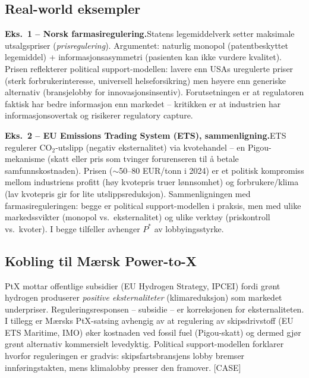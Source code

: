 \subsection*{Real-world eksempler}

\textbf{Eks.~1 -- Norsk farmasiregulering.}\quad [EKS]
Statens legemiddelverk setter maksimale utsalgspriser (\emph{prisregulering}). Argumentet: naturlig monopol (patentbeskyttet legemiddel) + informasjonsasymmetri (pasienten kan ikke vurdere kvalitet). Prisen reflekterer political support-modellen: lavere enn USAs uregulerte priser (sterk forbrukerinteresse, universell helseforsikring) men høyere enn generiske alternativ (bransjelobby for innovasjonsinsentiv). Forutsetningen er at regulatoren faktisk har bedre informasjon enn markedet -- kritikken er at industrien har informasjonsovertak og risikerer regulatory capture.

\textbf{Eks.~2 -- EU Emissions Trading System (ETS), sammenligning.}\quad [EKS]
ETS regulerer CO$_2$-utslipp (negativ eksternalitet) via kvotehandel -- en Pigou-mekanisme (skatt eller pris som tvinger forurenseren til å betale samfunnskostnaden). Prisen ($\sim$50--80 EUR/tonn i 2024) er et politisk kompromiss mellom industriens profitt (høy kvotepris truer lønnsomhet) og forbrukere/klima (lav kvotepris gir for lite utslippsreduksjon). Sammenligningen med farmasireguleringen: begge er political support-modellen i praksis, men med ulike markedssvikter (monopol vs.\ eksternalitet) og ulike verktøy (priskontroll vs.\ kvoter). I begge tilfeller avhenger $P^*$ av lobbyingsstyrke.

\subsection*{Kobling til Mærsk Power-to-X}
PtX mottar offentlige subsidier (EU Hydrogen Strategy, IPCEI) fordi grønt hydrogen produserer \emph{positive eksternaliteter} (klimareduksjon) som markedet underpriser. Reguleringsresponsen -- subsidie -- er korreksjonen for eksternaliteten. I tillegg er Mærsks PtX-satsing avhengig av at regulering av skipsdrivstoff (EU ETS Maritime, IMO) øker kostnaden ved fossil fuel (Pigou-skatt) og dermed gjør grønt alternativ kommersielt levedyktig. Political support-modellen forklarer hvorfor reguleringen er gradvis: skipsfartsbransjens lobby bremser innføringstakten, mens klimalobby presser den framover. [CASE]

